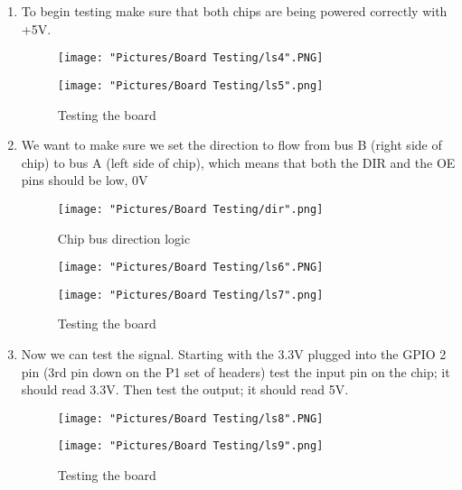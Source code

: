 \documentclass[12pt]{article}
\begin{document}
\begin{enumerate}
	\item To begin testing make sure that both chips are being powered correctly with +5V.
	
\begin{figure}[H]
 	\centering
  	\begin{minipage}[b]{0.45\textwidth}
		\texttt{[image: "Pictures/Board Testing/ls4".PNG]}
  	\end{minipage}
  	\hfill
  	\begin{minipage}[b]{0.45\textwidth}
    		\texttt{[image: "Pictures/Board Testing/ls5".png]}
  	\end{minipage}
	\caption{Testing the board}
\end{figure}

	\item We want to make sure we set the direction to flow from bus B (right side of chip) to bus A (left side of chip), which means that both the DIR and the OE pins should be low, 0V

\begin{figure}[H]
  	\centering
    	\texttt{[image: "Pictures/Board Testing/dir".png]}
 	\caption{Chip bus direction logic}
	\label{dir}
\end{figure}

\begin{figure}[H]
 	\centering
  	\begin{minipage}[b]{0.45\textwidth}
		\texttt{[image: "Pictures/Board Testing/ls6".PNG]}
  	\end{minipage}
  	\hfill
  	\begin{minipage}[b]{0.45\textwidth}
    		\texttt{[image: "Pictures/Board Testing/ls7".png]}
  	\end{minipage}
	\caption{Testing the board}
\end{figure}

	\item Now we can test the signal. Starting with the 3.3V plugged into the GPIO 2 pin (3rd pin down on the P1 set of headers) test the input pin on the chip; it should read 3.3V. Then test the output; it should read 5V.

\begin{figure}[H]
 	\centering
  	\begin{minipage}[b]{0.45\textwidth}
		\texttt{[image: "Pictures/Board Testing/ls8".PNG]}
  	\end{minipage}
  	\hfill
  	\begin{minipage}[b]{0.45\textwidth}
    		\texttt{[image: "Pictures/Board Testing/ls9".png]}
  	\end{minipage}
	\caption{Testing the board}
	\label{ls2}
\end{figure}


\end{enumerate}
\end{document}
